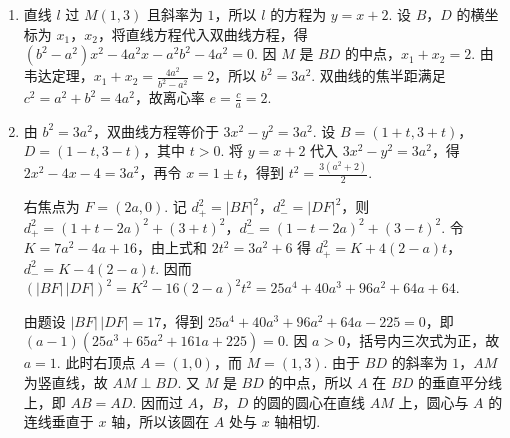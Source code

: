 \begin{solution}
\begin{enumerate}
\item 直线 \(l\) 过 \(M(1,3)\) 且斜率为 \(1\)，所以 \(l\) 的方程为 \(y=x+2\). 设 \(B\)，\(D\) 的横坐标为 \(x_1\)，\(x_2\)，将直线方程代入双曲线方程，得 \((b^2-a^2)x^2-4a^2x-a^2b^2-4a^2=0\). 因 \(M\) 是 \(BD\) 的中点，\(x_1+x_2=2\). 由韦达定理，\(x_1+x_2=\frac{4a^2}{b^2-a^2}=2\)，所以 \(b^2=3a^2\). 双曲线的焦半距满足 \(c^2=a^2+b^2=4a^2\)，故离心率 \(e=\frac{c}{a}=2\).
\item 由 \(b^2=3a^2\)，双曲线方程等价于 \(3x^2-y^2=3a^2\). 设 \(B=(1+t,3+t)\)，\(D=(1-t,3-t)\)，其中 \(t>0\). 将 \(y=x+2\) 代入 \(3x^2-y^2=3a^2\)，得 \(2x^2-4x-4=3a^2\)，再令 \(x=1\pm t\)，得到 \(t^2=\frac{3(a^2+2)}{2}\).

右焦点为 \(F=(2a,0)\). 记 \(d_+^2=|BF|^2\)，\(d_-^2=|DF|^2\)，则 \(d_+^2=\left(1+t-2a\right)^2+\left(3+t\right)^2\)，\(d_-^2=\left(1-t-2a\right)^2+\left(3-t\right)^2\). 令 \(K=7a^2-4a+16\)，由上式和 \(2t^2=3a^2+6\) 得 \(d_+^2=K+4(2-a)t\)，\(d_-^2=K-4(2-a)t\). 因而 \(\left(|BF|\,|DF|\right)^2=K^2-16(2-a)^2t^2=25a^4+40a^3+96a^2+64a+64\).

由题设 \(|BF|\,|DF|=17\)，得到 \(25a^4+40a^3+96a^2+64a-225=0\)，即 \((a-1)\left(25a^3+65a^2+161a+225\right)=0\). 因 \(a>0\)，括号内三次式为正，故 \(a=1\). 此时右顶点 \(A=(1,0)\)，而 \(M=(1,3)\). 由于 \(BD\) 的斜率为 \(1\)，\(AM\) 为竖直线，故 \(AM\perp BD\). 又 \(M\) 是 \(BD\) 的中点，所以 \(A\) 在 \(BD\) 的垂直平分线上，即 \(AB=AD\). 因而过 \(A\)，\(B\)，\(D\) 的圆的圆心在直线 \(AM\) 上，圆心与 \(A\) 的连线垂直于 \(x\) 轴，所以该圆在 \(A\) 处与 \(x\) 轴相切.
\end{enumerate}
\end{solution}
